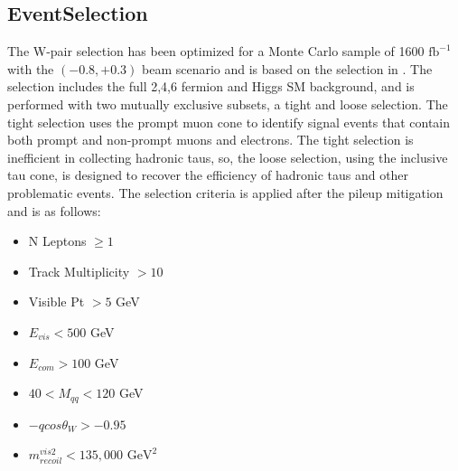\subsection{EventSelection}
\label{subsec:EventSelection}
The W-pair selection has been optimized for a Monte Carlo sample of 1600 $\text{fb}^{-1}$ with the $(-0.8,+0.3)$ beam scenario and is based on the selection in \cite{ivan}. The selection includes the full 2,4,6 fermion and Higgs SM background, and is performed with two mutually exclusive subsets, a tight and loose selection. The tight selection uses the prompt muon cone to identify signal events that contain both prompt and non-prompt muons and electrons. The tight selection is inefficient in collecting hadronic taus, so, the loose selection, using the inclusive tau cone, is designed to recover the efficiency of hadronic taus and other problematic events. The selection criteria is applied after the pileup mitigation and is as follows:
\begin{itemize}
\item N Leptons $\geq 1$
\item Track Multiplicity $> 10$  
\item Visible Pt $> 5$ GeV  
\item $E_{vis} < 500$ GeV 
\item $E_{com} > 100$ GeV
\item $40<M_{qq}<120$ GeV
\item  $-qcos\theta_W > -0.95$
\item  $m^{vis2}_{recoil} < 135,000 \, \, \text{GeV}^2$
\end{itemize}

